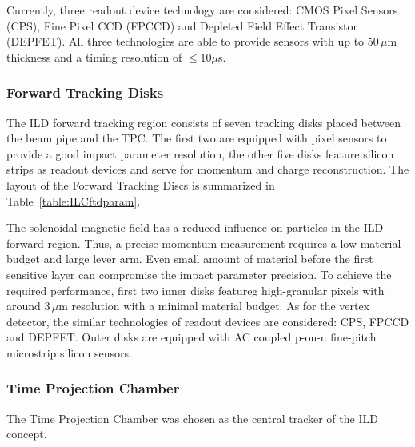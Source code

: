 Currently, three readout device technology are considered: CMOS Pixel Sensors (CPS), Fine Pixel CCD (FPCCD) and Depleted Field Effect Transistor (DEPFET).
All three technologies are able to provide sensors with up to 50\,$\mu$m thickness and a timing resolution of $\leq 10\mu$s. 


\subsubsection{Forward Tracking Disks}

The ILD forward tracking region consists of seven tracking disks placed between the beam pipe and the TPC. The first two are equipped with pixel sensors to provide a good impact parameter resolution, the other five disks feature silicon strips as readout devices and serve for momentum and charge reconstruction. The layout of the Forward Tracking Discs is summarized in Table~\ref{table:ILCftdparam}. 



The solenoidal magnetic field has a reduced influence on particles in the ILD forward region.
Thus, a precise momentum measurement requires a low material budget and large lever arm. Even small amount of material before the first sensitive layer can compromise the impact parameter precision. To achieve the required performance, first two inner disks featureg high-granular pixels with around 3\,$\mu$m resolution with a minimal material budget. As for the vertex detector, the similar technologies of readout devices are considered: CPS, FPCCD and DEPFET. Outer disks are equipped with AC coupled p-on-n fine-pitch microstrip silicon sensors.

\subsubsection{Time Projection Chamber}

The Time Projection Chamber was chosen as the central tracker of the ILD concept. %

